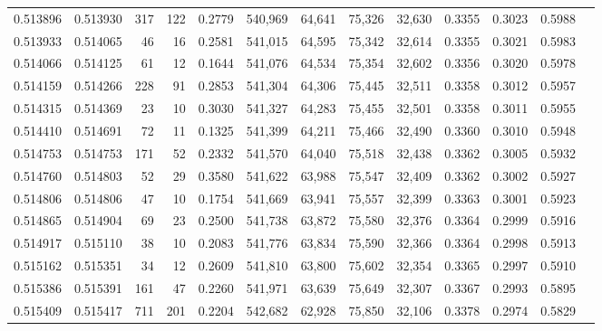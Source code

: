 \begin{tabular}{rrrrrrrrrrrrr}
0.513896 & 0.513930 &   317 &   122 &                                     0.2779 & 540,969 &  64,641 &  75,326 &  32,630 & 0.3355 & 0.3023 & 0.5988 \\
0.513933 & 0.514065 &    46 &    16 &                                     0.2581 & 541,015 &  64,595 &  75,342 &  32,614 & 0.3355 & 0.3021 & 0.5983 \\
0.514066 & 0.514125 &    61 &    12 &                                     0.1644 & 541,076 &  64,534 &  75,354 &  32,602 & 0.3356 & 0.3020 & 0.5978 \\
0.514159 & 0.514266 &   228 &    91 &                                     0.2853 & 541,304 &  64,306 &  75,445 &  32,511 & 0.3358 & 0.3012 & 0.5957 \\
0.514315 & 0.514369 &    23 &    10 &                                     0.3030 & 541,327 &  64,283 &  75,455 &  32,501 & 0.3358 & 0.3011 & 0.5955 \\
0.514410 & 0.514691 &    72 &    11 &                                     0.1325 & 541,399 &  64,211 &  75,466 &  32,490 & 0.3360 & 0.3010 & 0.5948 \\
0.514753 & 0.514753 &   171 &    52 &                                     0.2332 & 541,570 &  64,040 &  75,518 &  32,438 & 0.3362 & 0.3005 & 0.5932 \\
0.514760 & 0.514803 &    52 &    29 &                                     0.3580 & 541,622 &  63,988 &  75,547 &  32,409 & 0.3362 & 0.3002 & 0.5927 \\
0.514806 & 0.514806 &    47 &    10 &                                     0.1754 & 541,669 &  63,941 &  75,557 &  32,399 & 0.3363 & 0.3001 & 0.5923 \\
0.514865 & 0.514904 &    69 &    23 &                                     0.2500 & 541,738 &  63,872 &  75,580 &  32,376 & 0.3364 & 0.2999 & 0.5916 \\
0.514917 & 0.515110 &    38 &    10 &                                     0.2083 & 541,776 &  63,834 &  75,590 &  32,366 & 0.3364 & 0.2998 & 0.5913 \\
0.515162 & 0.515351 &    34 &    12 &                                     0.2609 & 541,810 &  63,800 &  75,602 &  32,354 & 0.3365 & 0.2997 & 0.5910 \\
0.515386 & 0.515391 &   161 &    47 &                                     0.2260 & 541,971 &  63,639 &  75,649 &  32,307 & 0.3367 & 0.2993 & 0.5895 \\
0.515409 & 0.515417 &   711 &   201 &                                     0.2204 & 542,682 &  62,928 &  75,850 &  32,106 & 0.3378 & 0.2974 & 0.5829 \\

\end{tabular}
